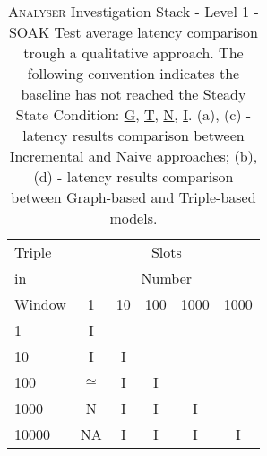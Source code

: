 \begin{table}[tbh]
{\begin{tabular}{l | ccccc}
	  	\hline
		Triple  & \multicolumn{5}{c}{Slots}  \\
		in & \multicolumn{5}{c}{Number}  \\
		Window  & 1 & 10 & 100 & 1000 &1000\\
		\hline			
		1	&I	\\			
		10	&I	&I		\\	
		100	& $\simeq$	&I	&I		\\
		1000 &	N	&I	&I	&I	\\
		10000&	NA	&I	&I	&I	&I\\
		\hline %
		\end{tabular}
	}
	\caption[\textsc{Analyser} Investigation Stack - Level 1 - SOAK Test Average Latency Comparison]{\textsc{Analyser} Investigation Stack - Level 1 - SOAK Test average latency comparison trough a qualitative approach. The following convention indicates the baseline has not reached the Steady State Condition:
	\underline{G}, \underline{T}, \underline{N}, \underline{I}.
	(a), (c) - latency results comparison between Incremental and Naive approaches; (b), (d) - latency results comparison between Graph-based and Triple-based models.}
	\label{tab:soak_latency_comparisons}	
\end{table}